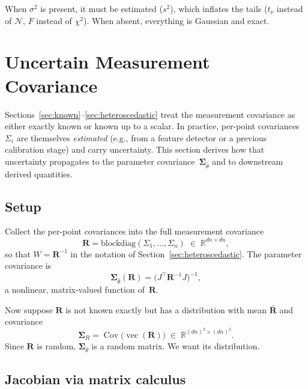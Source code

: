 \documentclass[11pt]{article}
\newcommand{\Normal}{\mathcal{N}}
\newcommand{\vect}{\operatorname{vec}}
\newcommand{\Cov}{\operatorname{Cov}}
\begin{document}
\noindent When $\sigma^2$ is present, it must be estimated ($s^2$),
which inflates the tails ($t_\nu$ instead of $\Normal$, $F$ instead of $\chi^2$).
When absent, everything is Gaussian and exact.

\section{Uncertain Measurement Covariance}
\label{sec:uncertain-R}

Sections~\ref{sec:known}--\ref{sec:heteroscedastic} treat the measurement
covariance as either exactly known or known up to a scalar.  In practice,
per-point covariances $\Sigma_i$ are themselves \emph{estimated} (e.g., from
a feature detector or a previous calibration stage) and carry uncertainty.
This section derives how that uncertainty propagates to the parameter
covariance~$\boldsymbol{\Sigma}_{\hat\theta}$ and to downstream derived
quantities.

\subsection{Setup}

Collect the per-point covariances into the full measurement covariance
\begin{equation}
  \mathbf{R}
    = \mathrm{blockdiag}(\Sigma_1, \ldots, \Sigma_n)
    \;\in\; \mathbb{R}^{dn \times dn},
\end{equation}
so that $W = \mathbf{R}^{-1}$ in the notation of
Section~\ref{sec:heteroscedastic}.  The parameter covariance is
\begin{equation}
  \boldsymbol{\Sigma}_{\hat\theta}(\mathbf{R})
    = \bigl(J^\top \mathbf{R}^{-1} J\bigr)^{-1},
\end{equation}
a nonlinear, matrix-valued function of~$\mathbf{R}$.

Now suppose $\mathbf{R}$ is not known exactly but has a distribution
with mean $\bar{\mathbf{R}}$ and covariance
\begin{equation}
  \boldsymbol{\Sigma}_{\!R}
    = \Cov\!\bigl(\vect(\mathbf{R})\bigr)
    \;\in\; \mathbb{R}^{(dn)^2 \times (dn)^2}.
\end{equation}
Since $\mathbf{R}$ is random,
$\boldsymbol{\Sigma}_{\hat\theta}$ is a random matrix.  We want its
distribution.

\subsection{Jacobian via matrix calculus}
\end{document}
